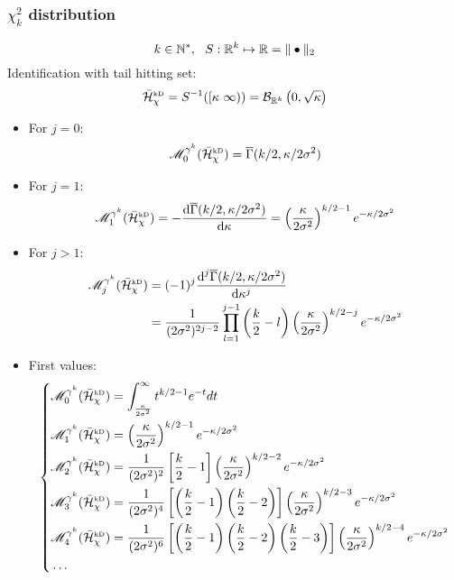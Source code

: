 \documentclass[12pt]{article}
\begin{document}
\subsubsection{$\chi^2_k$ distribution}
\begin{equation}
  k\in\NZ, \ \ \rfunc:\Rk\mapsto\RR=\|\bullet\|_2
\end{equation}
Identification with tail hitting set:
\begin{equation}
  \bar{\mathcal{H}}^{\text{\tiny kD}}_{\chi}=S^{-1}([\kappa\ \infty))=\mathcal{B}_{\mathbb{R}^k}\left(0,\sqrt{\kappa}\right)
\end{equation}

\begin{itemize}
\item For $j=0$:
\begin{equation}
  \mathscr{M}^{\gamma^k}_0(\bar{\mathcal{H}}^{\text{\tiny kD}}_{\chi})=\overline{\Gamma}(k/2,\kappa/2\sigma^2)
\end{equation}
\item For $j=1$:
\begin{equation}
  \mathscr{M}^{\gamma^k}_1(\bar{\mathcal{H}}^{\text{\tiny kD}}_{\chi})=-\frac{\text{d}\overline{\Gamma}(k/2,\kappa/2\sigma^2)}{\text{d}\kappa}=\left(\frac{\kappa}{2\sigma^2}\right)^{k/2-1}e^{-\kappa/2\sigma^2}
\end{equation}
\item For $j>1$:
  \begin{equation}
    \begin{aligned}
      \mathscr{M}^{\gamma^k}_j(\bar{\mathcal{H}}^{\text{\tiny kD}}_{\chi})&=(-1)^j\frac{\text{d}^j\overline{\Gamma}(k/2,\kappa/2\sigma^2)}{\text{d}\kappa^j}\\
                       &=\frac{1}{(2\sigma^2)^{2j-2}}\prod_{l=1}^{j-1}\left(\frac{k}{2}-l\right)\left(\frac{\kappa}{2\sigma^2}\right)^{k/2-j}e^{-\kappa/2\sigma^2}
    \end{aligned}
  \end{equation}

\item First values:
  \begin{equation}
    \left\{
    \begin{aligned}
      &\mathscr{M}^{\gamma^k}_0(\bar{\mathcal{H}}^{\text{\tiny kD}}_{\chi}) = \int_{\frac{\kappa}{2\sigma^2}}^\infty t^{k/2-1}e^{-t} dt\\ 
      &\mathscr{M}^{\gamma^k}_1(\bar{\mathcal{H}}^{\text{\tiny kD}}_{\chi}) = \left(\frac{\kappa}{2\sigma^2}\right)^{k/2-1}e^{-\kappa/2\sigma^2}\\
      &\mathscr{M}^{\gamma^k}_2(\bar{\mathcal{H}}^{\text{\tiny kD}}_{\chi}) = \frac{1}{(2\sigma^2)^2}\left[\frac{k}{2}-1\right] \left(\frac{\kappa}{2\sigma^2}\right)^{k/2-2}e^{-\kappa/2\sigma^2}\\
      &\mathscr{M}^{\gamma^k}_3(\bar{\mathcal{H}}^{\text{\tiny kD}}_{\chi}) = \frac{1}{(2\sigma^2)^4}\left[\left(\frac{k}{2}-1\right)\left(\frac{k}{2}-2\right)\right] \left(\frac{\kappa}{2\sigma^2}\right)^{k/2-3}e^{-\kappa/2\sigma^2}\\
      &\mathscr{M}^{\gamma^k}_4(\bar{\mathcal{H}}^{\text{\tiny kD}}_{\chi}) = \frac{1}{(2\sigma^2)^6}\left[\left(\frac{k}{2}-1\right)\left(\frac{k}{2}-2\right)\left(\frac{k}{2}-3\right)\right] \left(\frac{\kappa}{2\sigma^2}\right)^{k/2-4}e^{-\kappa/2\sigma^2}\\
      &\dots \\
    \end{aligned}
    \right.
  \end{equation}
\end{itemize}
\end{document}
